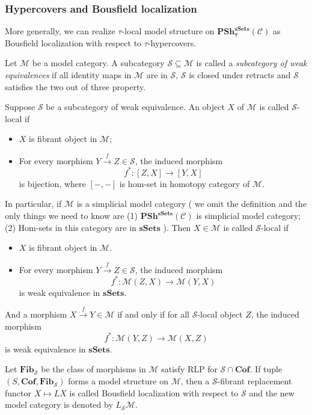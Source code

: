 \documentclass[b5paper,10pt]{article}
\begin{document}
\subsubsection{Hypercovers and Bousfield localization}
More generally, we can realize $\tau$-local model structure on $\mathbf{PSh^{sSets}_\tau}(\mathcal{C})$ as Bousfield localization with respect to $\tau$-hypercovers.

Let $\mathcal{M}$ be a model category. A subcategory $\mathcal{S} \subseteq \mathcal{M}$ is called 
a \emph{subcategory of weak equivalences} if all identity maps in $\mathcal{M}$ are in $\mathcal{S}$, $\mathcal{S}$ is closed under retracts and $\mathcal{S}$ satisfies the two out of three property.
\begin{secdefn}
	Suppose $\mathcal{S}$ be a subcategory of weak equivalence. An object $X$ of $\mathcal{M}$ is called $\mathcal{S}$-local if 
	\begin{itemize}
		\item $X$ is fibrant object in $\mathcal{M}$;
		\item  For every morphism $Y \xrightarrow{f} Z \in \mathcal{S}$, the induced morphism 
		\[
		f^* \colon [Z,X] \to [Y,X]
		\]
		is bijection, where $[-,-]$ is hom-set in homotopy category of $\mathcal{M}$.
	\end{itemize}
\end{secdefn}
In particular, if $\mathcal{M}$ is a simplicial model category ( we omit the definition and the only things we need to know are (1) $\mathbf{PSh^{sSets}}(\mathcal{C})$ is simplicial model category; (2) Hom-sets in this category are in $\mathbf{sSets}$
 ). Then $X\in \mathcal{M}$ is called $\mathcal{S}$-local if 
 \begin{itemize}
 	\item $X$ is fibrant object in $\mathcal{M}$.
 	\item For every morphism $Y \xrightarrow{f} Z \in \mathcal{S}$, the induced morphism
 	\[
 	f^* \colon \mathcal{M}(Z,X) \to \mathcal{M}(Y,X)
 	\]
 	is weak equivalence in $\mathbf{sSets}$.
 \end{itemize}
And a morphism $X \xrightarrow{f} Y \in \mathcal{M}$ if and only if for all $\mathcal{S}$-local object $Z$, the induced morphism
\[
f^* \colon \mathcal{M}(Y,Z) \to \mathcal{M}(X,Z) 
\]
is weak equivalence in $\mathbf{sSets}$.
\begin{secdefn} Let $\mathbf{Fib}_{\mathcal{S}}$ be the class of morphisms in $\mathcal{M}$ satisfy RLP for $\mathcal{S} \cap \mathbf{Cof}$.
	If tuple $(S,\mathbf{Cof},\mathbf{Fib}_\mathcal{S})$ forms a model structure on $\mathcal{M}$, then a $\mathcal{S}$-fibrant replacement functor $ X \mapsto LX$ is called Bousfield localization with respect to $\mathcal{S}$ and the new model category is denoted by $L_\mathcal{S} \mathcal{M}$.
\end{secdefn}
\end{document}
